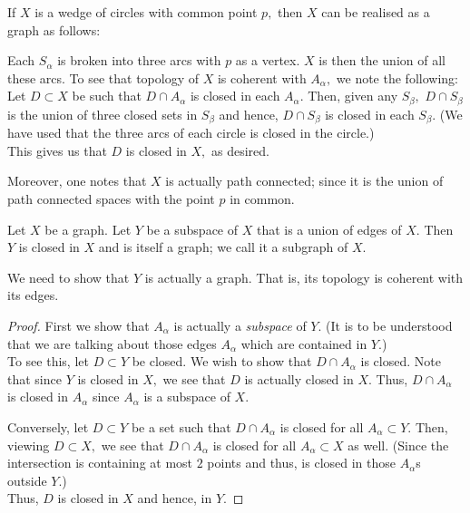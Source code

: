 \documentclass[12pt]{article}
\begin{document}
\begin{ex} \label{ex:wedgeasgraph}
	If $X$ is a wedge of circles with common point $p,$ then $X$ can be realised as a graph as follows: 

	Each $S_\alpha$ is broken into three arcs with $p$ as a vertex. $X$ is then the union of all these arcs. To see that topology of $X$ is coherent with $A_\alpha,$ we note the following: Let $D \subset X$ be such that $D \cap A_\alpha$ is closed in each $A_\alpha.$ Then, given any $S_\beta,$ $D \cap S_\beta$ is the union of three closed sets in $S_\beta$ and hence, $D \cap S_\beta$ is closed in each $S_\beta.$ (We have used that the three arcs of each circle is closed in the circle.)\\
	This gives us that $D$ is closed in $X,$ as desired.

	Moreover, one notes that $X$ is actually path connected; since it is the union of path connected spaces with the point $p$ in common.
\end{ex}

\begin{defn}[Subgraph]
	Let $X$ be a graph. Let $Y$ be a subspace of $X$ that is a union of edges of $X.$ Then $Y$ is closed in $X$ and is itself a graph; we call it a subgraph of $X.$
\end{defn}

We need to show that $Y$ is actually a graph. That is, its topology is coherent with its edges.

\begin{proof} 
	First we show that $A_\alpha$ is actually a \emph{subspace} of $Y.$ (It is to be understood that we are talking about those edges $A_\alpha$ which are contained in $Y.$)\\
	To see this, let $D \subset Y$ be closed. We wish to show that $D \cap A_\alpha$ is closed. Note that since $Y$ is closed in $X,$ we see that $D$ is actually closed in $X.$ Thus, $D \cap A_\alpha$ is closed in $A_\alpha$ since $A_\alpha$ is a subspace of $X.$

	Conversely, let $D \subset Y$ be a set such that $D \cap A_\alpha$ is closed for all $A_\alpha \subset Y.$ Then, viewing $D \subset X,$ we see that $D \cap A_\alpha$ is closed for all $A_\alpha \subset X$ as well. (Since the intersection is containing at most $2$ points and thus, is closed in those $A_\alpha$s outside $Y.$)\\
	Thus, $D$ is closed in $X$ and hence, in $Y.$
\end{proof}
\end{document}
